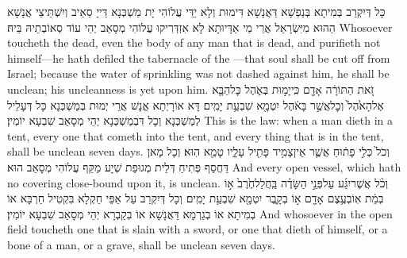 {כָּל דְּיִקְרַב בְּמִיתָא בְּנַפְשָׁא דַּאֲנָשָׁא דִּימוּת וְלָא יַדֵּי עֲלוֹהִי יָת מַשְׁכְּנָא דַּייָ סַאֵיב וְיִשְׁתֵּיצֵי אֲנָשָׁא הַהוּא מִיִּשְׂרָאֵל אֲרֵי מֵי אַדָּיוּתָא לָא אִזְדְּרִיקוּ עֲלוֹהִי מְסָאַב יְהֵי עוֹד סְאוֹבְתֵיהּ בֵּיהּ׃}
{Whosoever toucheth the dead, even the body of any man that is dead, and purifieth not himself—he hath defiled the tabernacle of the \lord—that soul shall be cut off from Israel; because the water of sprinkling was not dashed against him, he shall be unclean; his uncleanness is yet upon him.}{}
{זֹ֚את הַתּוֹרָ֔ה אָדָ֖ם כִּֽי\maqqaf יָמ֣וּת בְּאֹ֑הֶל כׇּל\maqqaf הַבָּ֤א אֶל\maqqaf הָאֹ֙הֶל֙ וְכׇל\maqqaf אֲשֶׁ֣ר בָּאֹ֔הֶל יִטְמָ֖א שִׁבְעַ֥ת יָמִֽים׃}
{דָּא אוֹרָיְתָא אֱנָשׁ אֲרֵי יְמוּת בְּמַשְׁכְּנָא כָּל דְּעָלֵיל לְמַשְׁכְּנָא וְכָל דִּבְמַשְׁכְּנָא יְהֵי מְסָאַב שִׁבְעָא יוֹמִין׃}
{This is the law: when a man dieth in a tent, every one that cometh into the tent, and every thing that is in the tent, shall be unclean seven days.}{}
{וְכֹל֙ כְּלִ֣י פָת֔וּחַ אֲשֶׁ֛ר אֵין\maqqaf צָמִ֥יד פָּתִ֖יל עָלָ֑יו טָמֵ֖א הֽוּא׃}
{וְכָל מָאן דַּחֲסַף פְּתִיחַ דְּלֵית מְגוּפַת שְׁיָע מַקַּף עֲלוֹהִי מְסָאַב הוּא׃}
{And every open vessel, which hath no covering close-bound upon it, is unclean.}{}
{וְכֹ֨ל אֲשֶׁר\maqqaf יִגַּ֜ע עַל\maqqaf פְּנֵ֣י הַשָּׂדֶ֗ה בַּֽחֲלַל\maqqaf חֶ֙רֶב֙ א֣וֹ בְמֵ֔ת אֽוֹ\maqqaf בְעֶ֥צֶם אָדָ֖ם א֣וֹ בְקָ֑בֶר יִטְמָ֖א שִׁבְעַ֥ת יָמִֽים׃}
{וְכָל דְּיִקְרַב עַל אַפֵּי חַקְלָא בִּקְטִיל חַרְבָּא אוֹ בְמִיתָא אוֹ בְגַרְמָא דַּאֲנָשָׁא אוֹ בְקַבְרָא יְהֵי מְסָאַב שִׁבְעָא יוֹמִין׃}
{And whosoever in the open field toucheth one that is slain with a sword, or one that dieth of himself, or a bone of a man, or a grave, shall be unclean seven days.}{}
